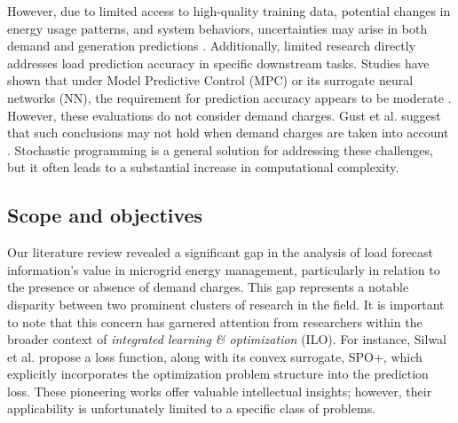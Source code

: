 However, due to limited access to high-quality training data, potential changes in energy usage patterns, and system behaviors, uncertainties may arise in both demand and generation predictions \cite{tian2022daily}. Additionally, limited research directly addresses load prediction accuracy in specific downstream tasks. Studies have shown that under Model Predictive Control (MPC) or its surrogate neural networks (NN), the requirement for prediction accuracy appears to be moderate \cite{sun2016nonlinear, wu2022learning}. However, these evaluations do not consider demand charges. Gust et al. suggest that such conclusions may not hold when demand charges are taken into account \cite{gust2021strategies}. Stochastic programming is a general solution for addressing these challenges, but it often leads to a substantial increase in computational complexity.

\subsection{Scope and objectives}

Our literature review revealed a significant gap in the analysis of load forecast information's value in microgrid energy management, particularly in relation to the presence or absence of demand charges. This gap represents a notable disparity between two prominent clusters of research in the field. It is important to note that this concern has garnered attention from researchers within the broader context of \emph{integrated learning \& optimization} (ILO). For instance, Silwal et al. \cite{elmachtoub2022smart} propose a loss function, along with its convex surrogate, SPO+, which explicitly incorporates the optimization problem structure into the prediction loss. These pioneering works offer valuable intellectual insights; however, their applicability is unfortunately limited to a specific class of problems.

